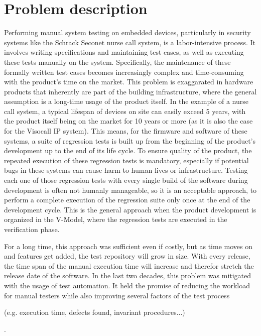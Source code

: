 \documentclass[Proposal,BIC,english,IEEE]{BASE/twbook} %
\begin{document}
\chapter{Problem description}
Performing manual system testing on embedded devices, particularly in security systems like the Schrack Seconet nurse call system, is a labor-intensive process. It involves writing specifications and maintaining test cases, as well as executing these tests manually on the system. Specifically, the maintenance of these formally written test cases becomes increasingly complex and time-consuming with the product's time on the market. This problem is exaggarated in hardware products that inherently are part of the building infrastructure, where the general assumption is a long-time usage of the product itself. In the example of a nurse call system, a typical lifespan of devices on site can easily exceed 5 years, with the product itself being on the market for 10 years or more (as it is also the case for the Visocall IP system).
This means, for the firmware and software of these systems, a suite of regression tests is built up from the beginning of the product's development up to the end of its life cycle. To ensure quality of the product, the repeated execution of these regression tests is mandatory, especially if potential bugs in these systems can cause harm to human lives or infrastructure.
Testing each one of those regression tests with every single build of the software during development is often not humanly manageable, so it is an acceptable approach, to perform a complete execution of the regression suite only once at the end of the development cycle. This is the general approach when the product development is organized in the V-Model, where the regression tests are executed in the verification phase.

For a long time, this approach was sufficient even if costly, but as time moves on and features get added, the test repository will grow in size. With every release, the time span of the manual execution time will increase and therefor stretch the release date of the software.
In the last two decades, this problem was mitigated with the usage of test automation. It held the promise of reducing the workload for manual testers while also improving several factors of the test process \begin{em}(e.g. execution time, defects found, invariant procedures...)\end{em}.
\end{document}
